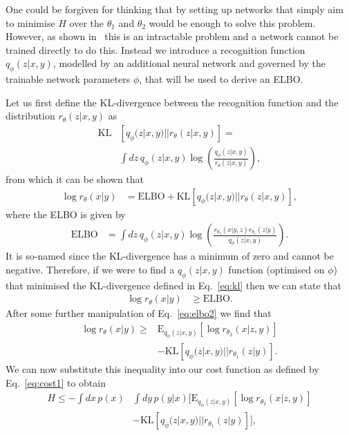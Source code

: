 %
%
One could be forgiven for thinking that by setting up networks that simply aim
to minimise $H$ over the $\theta_{1}$ and $\theta_{2}$ would be enough to solve
this problem. However, as shown in~\cite{NIPS2015_5775} this is an intractable
problem and a network cannot be trained directly to do this. Instead we
introduce a recognition function $q_{\phi}(z|x,y)$, modelled by an
additional neural network and governed by the trainable network parameters
$\phi$, that will be used to derive an \ac{ELBO}.

%
%
Let us first define the \ac{KL}-divergence between the recognition function and
the distribution $r_{\theta}(z|x,y)$ as 
%
\begin{align}\label{eq:kl}
\text{KL}&\left[q_{\phi}(z|x,y)||r_{\theta}(z|x,y)\right] = \\
&\int dz\,q_{\phi}(z|x,y)
\log\left(\frac{q_{\phi}(z|x,y)}{r_{\theta}(z|x,y)}\right),\nonumber
\end{align}
%   
from which it can be shown that
%
\begin{align}\label{eq:elbo1}
\log r_{\theta}(x|y) &= \text{ELBO} + \text{KL}\left[q_{\phi}(z|x,y)||r_{\theta}(z|x,y)\right],
\end{align}
%
where the \ac{ELBO} is given by
%
\begin{align}\label{eq:elbo2}
\text{ELBO} &= \int dz\,
q_{\phi}(z|x,y)\log\left(\frac{r_{\theta_{2}}(x|y,z)r_{\theta_{1}}(z|y)}{q_{\phi}(z|x,y)}\right).
\end{align}
%
It is so-named since the \ac{KL}-divergence has a minimum of zero and cannot
be negative. Therefore, if we were to find a $q_{\phi}(z|x,y)$ function (optimised on
$\phi$) that minimised the \ac{KL}-divergence defined in Eq.~\ref{eq:kl} then we can state that
%
\begin{align}
\log r_{\theta}(x|y) &\geq \text{ELBO}.
\end{align}
%
After some further manipulation of Eq.~\ref{eq:elbo2} we find that
%
\begin{align}\label{eq:logr}
\log r_{\theta}(x|y) \geq  &\text{E}_{q_{\phi}(z|x,y)}\left[\log
r_{\theta_{2}}(x|z,y)\right] \nonumber\\
&-\text{KL}\left[q_{\phi}(z|x,y)||r_{\theta_{1}}(z|y)\right].
\end{align}
%
We can now substitute this inequality into our cost function as defined by
Eq.~\ref{eq:cost1} to obtain
%
\begin{align}\label{eq:cost2}
H \leq  -\int dx\, p(x)&\int dy \,p(y|x)
\Big[\text{E}_{q_{\phi}(z|x,y)}\left[\log r_{\theta_{2}}(x|z,y)\right]
\nonumber\\
&-\text{KL}\left[q_{\phi}(z|x,y)||r_{\theta_{1}}(z|y)\right]\Big],  
\end{align}
